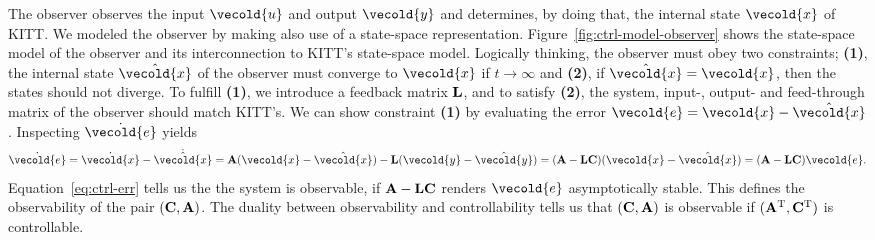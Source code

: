 \documentclass[11pt,titlepage]{report}
\let\vec\vecold
\newcommand{\vec}[1]{\mathbf{#1}}
\begin{document}
The observer observes the input $\vec{u}$ and output $\vec{y}$ and determines, by doing that, the internal state $\vec{x}$ of KITT. We modeled the observer by making also use of a state-space representation. Figure~\ref{fig:ctrl-model-observer} shows the state-space model of the observer and its interconnection to KITT's state-space model. Logically thinking, the observer must obey two constraints; \textbf{(1)}, the internal state $\hat{\vec{x}}$ of the observer must converge to $\vec{x}$ if $t \to \infty$ and \textbf{(2)}, if $\hat{\vec{x}} = \vec{x}$, then the states should not diverge. To fulfill \textbf{(1)}, we introduce a feedback matrix $\mathbf{L}$, and to satisfy \textbf{(2)}, the system, input-, output- and feed-through matrix of the observer should match KITT's. We can show constraint \textbf{(1)} by evaluating the error $\vec{e}=\vec{x}-\hat{\vec{x}}$. Inspecting $\dot{\vec{e}}$ yields 
\begin{equation} \label{eq:ctrl-err}
	\dot{\vec{e}}=\dot{\vec{x}} - \dot{\hat{\vec{x}}} = \mat{A} (\vec{x} - \hat{\vec{x}}) - \mat{L} (\vec{y} - \hat{\vec{y}}) = (\mat{A} - \mat{L} \mat{C}) (\vec{x} - \hat{\vec{x}}) = (\mat{A} - \mat{L}\mat{C}) \vec{e}.
\end{equation}
Equation~\ref{eq:ctrl-err} tells us the the system is observable, if $\mathbf{A} - \mathbf{L}\mathbf{C}$ renders $\vec{e}$ asymptotically stable. This defines the observability of the pair $(\mathbf{C}, \mathbf{A})$. The duality between observability and controllability tells us that $(\mathbf{C},\mathbf{A})$ is observable if $(\mathbf{A}^{\text T},\mathbf{C}^{\text T})$ is controllable.
\end{document}
